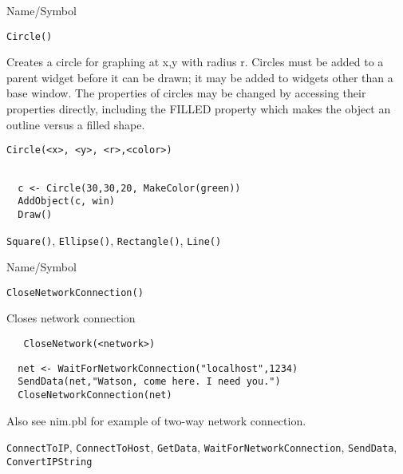 \rl

\begin{desc}{Name/Symbol}
\item[Name/Symbol]	\verb+Circle()+

\item[Description] Creates a circle for graphing at x,y with radius r.
  Circles must be added to a parent widget before it can be drawn; it
  may be added to widgets other than a base window. The properties of
  circles may be changed by accessing their properties directly,
  including the FILLED property which makes the object an outline
  versus a filled shape.


\item[Usage]
\begin{verbatim}
Circle(<x>, <y>, <r>,<color>)
\end{verbatim}

\item[Example]	
\begin{verbatim}
  
  c <- Circle(30,30,20, MakeColor(green))
  AddObject(c, win)
  Draw()

\end{verbatim}
\item[See Also]	\verb+Square()+, \verb+Ellipse()+, \verb+Rectangle()+, \verb+Line()+
\end{desc}

\rl




\begin{desc}{Name/Symbol}
\item[Name/Symbol]	\verb+CloseNetworkConnection()+

\item[Description]	Closes network connection

\item[Usage]
\begin{verbatim}
   CloseNetwork(<network>)
\end{verbatim}

\item[Example]	

\begin{verbatim}
  net <- WaitForNetworkConnection("localhost",1234)
  SendData(net,"Watson, come here. I need you.")
  CloseNetworkConnection(net)
\end{verbatim}
Also see nim.pbl for example of two-way network connection.
\item[See Also]
  \verb+ConnectToIP+, \verb+ConnectToHost+, \verb+GetData+, \verb+WaitForNetworkConnection+,
   \verb+SendData+, \verb+ConvertIPString+
\end{desc}


